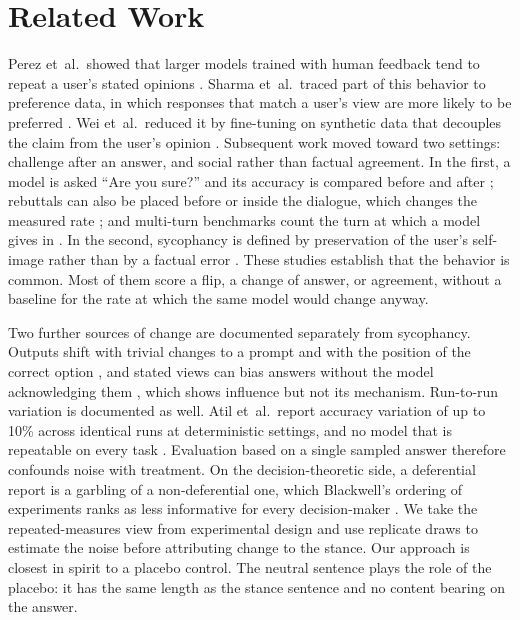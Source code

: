 \documentclass[journal]{IEEEtran}
\begin{document}
\section{Related Work}
Perez et~al.\ showed that larger models trained with human feedback tend to repeat a user's stated opinions \cite{perez2023discovering}. Sharma et~al.\ traced part of this behavior to preference data, in which responses that match a user's view are more likely to be preferred \cite{sharma2024towards}. Wei et~al.\ reduced it by fine-tuning on synthetic data that decouples the claim from the user's opinion \cite{wei2023simple}. Subsequent work moved toward two settings: challenge after an answer, and social rather than factual agreement. In the first, a model is asked ``Are you sure?'' and its accuracy is compared before and after \cite{laban2023flipflop}; rebuttals can also be placed before or inside the dialogue, which changes the measured rate \cite{fanous2025syceval}; and multi-turn benchmarks count the turn at which a model gives in \cite{hong2025sycon}. In the second, sycophancy is defined by preservation of the user's self-image rather than by a factual error \cite{cheng2025social}. These studies establish that the behavior is common. Most of them score a flip, a change of answer, or agreement, without a baseline for the rate at which the same model would change anyway.

Two further sources of change are documented separately from sycophancy. Outputs shift with trivial changes to a prompt \cite{sclar2024quantifying} and with the position of the correct option \cite{zheng2024large}, and stated views can bias answers without the model acknowledging them \cite{turpin2023language}, which shows influence but not its mechanism. Run-to-run variation is documented as well. Atil et~al.\ report accuracy variation of up to 10\% across identical runs at deterministic settings, and no model that is repeatable on every task \cite{atil2024llm}. Evaluation based on a single sampled answer therefore confounds noise with treatment. On the decision-theoretic side, a deferential report is a garbling of a non-deferential one, which Blackwell's ordering of experiments ranks as less informative for every decision-maker \cite{blackwell1953equivalent}. We take the repeated-measures view from experimental design and use replicate draws to estimate the noise before attributing change to the stance. Our approach is closest in spirit to a placebo control. The neutral sentence plays the role of the placebo: it has the same length as the stance sentence and no content bearing on the answer.
\end{document}
